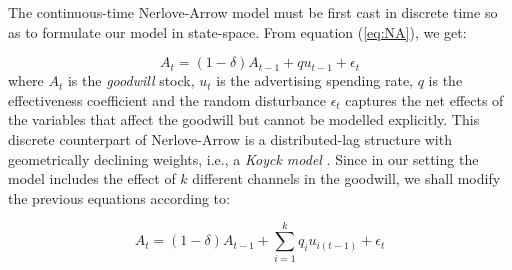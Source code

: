 The continuous-time Nerlove-Arrow model must be first cast in discrete time so as to formulate our model in state-space. From equation (\ref{eq:NA}), we get:

$$
A_t =  (1-\delta) A_{t-1} + q u_{t-1} + \epsilon_t 
$$
where $A_t$ is the \emph{goodwill} stock, $u_t$ is the advertising spending rate, $q$ is the effectiveness coefficient and the random disturbance $\epsilon_t$  captures the net effects of the variables that affect the goodwill  but cannot be modelled explicitly.  This discrete counterpart of Nerlove-Arrow is a distributed-lag structure with geometrically declining weights, i.e., a \emph{Koyck model} \cite{clarke1976econometric, koyck1954distributed}. Since in our setting the model includes the effect of $k$ different channels in the goodwill, we shall modify the previous equations according to:

$$
A_t =  (1-\delta) A_{t-1} + \sum_{i=1}^k q_i u_{i(t-1)} + \epsilon_t 
$$

